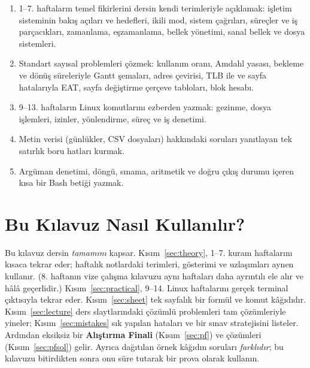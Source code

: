 \vspace{0.8em}
\begin{keyidea}
\begin{enumerate}[leftmargin=1.4em]
  \item 1--7. haftaların temel fikirlerini dersin kendi terimleriyle açıklamak: işletim sisteminin bakış açıları ve hedefleri, ikili mod, sistem çağrıları, süreçler ve iş parçacıkları, zamanlama, eşzamanlama, bellek yönetimi, sanal bellek ve dosya sistemleri.
  \item Standart sayısal problemleri çözmek: kullanım oranı, Amdahl yasası, bekleme ve dönüş süreleriyle Gantt şemaları, adres çevirisi, TLB ile ve sayfa hatalarıyla EAT, sayfa değiştirme çerçeve tabloları, blok hesabı.
  \item 9--13. haftaların Linux komutlarını ezberden yazmak: gezinme, dosya işlemleri, izinler, yönlendirme, süreç ve iş denetimi.
  \item Metin verisi (günlükler, CSV dosyaları) hakkındaki soruları yanıtlayan tek satırlık boru hatları kurmak.
  \item Argüman denetimi, döngü, sınama, aritmetik ve doğru çıkış durumu içeren kısa bir Bash betiği yazmak.
\end{enumerate}
\end{keyidea}

\setcounter{tocdepth}{1}
\tableofcontents

\section{Bu Kılavuz Nasıl Kullanılır?}

Bu kılavuz dersin \emph{tamamını} kapsar. Kısım~\ref{sec:theory}, 1--7. kuram haftalarını kısaca tekrar eder; haftalık notlardaki terimleri, gösterimi ve uzlaşımları aynen kullanır. (8. haftanın vize çalışma kılavuzu aynı haftaları daha ayrıntılı ele alır ve hâlâ geçerlidir.) Kısım~\ref{sec:practical}, 9--14. Linux haftalarını gerçek terminal çıktısıyla tekrar eder. Kısım~\ref{sec:sheet} tek sayfalık bir formül ve komut kâğıdıdır. Kısım~\ref{sec:lecture} ders slaytlarındaki çözümlü problemleri tam çözümleriyle yineler; Kısım~\ref{sec:mistakes} sık yapılan hataları ve bir sınav stratejisini listeler. Ardından eksiksiz bir \textbf{Alıştırma Finali} (Kısım~\ref{sec:pf}) ve çözümleri (Kısım~\ref{sec:pfsol}) gelir. Ayrıca dağıtılan örnek kâğıdın soruları \emph{farklıdır}; bu kılavuzu bitirdikten sonra onu süre tutarak bir prova olarak kullanın.

